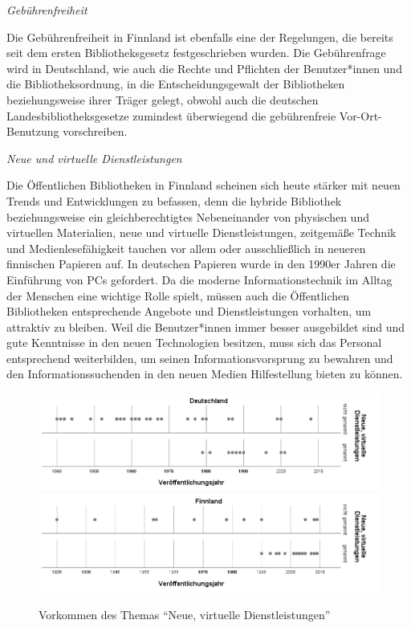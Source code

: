 \documentclass[a4paper,
fontsize=11pt,
oneside,
numbers=noperiodatend,
parskip=half-,
bibliography=totoc,
final
]{scrartcl}
\begin{document}
\emph{Gebührenfreiheit}

Die Gebührenfreiheit in Finnland ist ebenfalls eine der Regelungen, die
bereits seit dem ersten Bibliotheksgesetz festgeschrieben wurden. Die
Gebührenfrage wird in Deutschland, wie auch die Rechte und Pflichten der
Benutzer*innen und die Bibliotheksordnung, in die Entscheidungsgewalt
der Bibliotheken beziehungsweise ihrer Träger gelegt, obwohl auch die
deutschen Landesbibliotheksgesetze zumindest überwiegend die
gebührenfreie Vor-Ort-Benutzung vorschreiben.

\emph{Neue und virtuelle Dienstleistungen}

Die Öffentlichen Bibliotheken in Finnland scheinen sich heute stärker
mit neuen Trends und Entwicklungen zu befassen, denn die hybride
Bibliothek beziehungsweise ein gleichberechtigtes Nebeneinander von
physischen und virtuellen Materialien, neue und virtuelle
Dienstleistungen, zeitgemäße Technik und Medienlesefähigkeit tauchen vor
allem oder ausschließlich in neueren finnischen Papieren auf. In
deutschen Papieren wurde in den 1990er Jahren die Einführung von PCs
gefordert. Da die moderne Informationstechnik im Alltag der Menschen
eine wichtige Rolle spielt, müssen auch die Öffentlichen Bibliotheken
entsprechende Angebote und Dienstleistungen vorhalten, um attraktiv zu
bleiben. Weil die Benutzer*innen immer besser ausgebildet sind und gute
Kenntnisse in den neuen Technologien besitzen, muss sich das Personal
entsprechend weiterbilden, um seinen Informationsvorsprung zu bewahren
und den Informationssuchenden in den neuen Medien Hilfestellung bieten
zu können.

\begin{figure}
\centering
\includegraphics{img/abb_2_de.png} 
\includegraphics{img/abb_2_fin.png}
\caption{Vorkommen des Themas \enquote{Neue, virtuelle Dienstleistungen}}
\end{figure}
\end{document}
